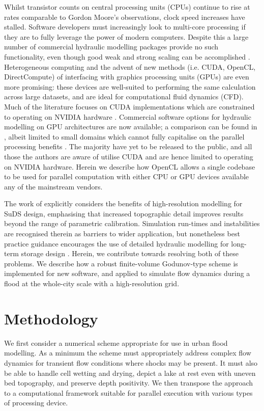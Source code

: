 Whilst transistor counts on central processing units (CPUs) continue to rise at rates comparable to Gordon Moore's observations, clock speed increases have stalled. Software developers must increasingly look to multi-core processing if they are to fully leverage the power of modern computers. Despite this a large number of commercial hydraulic modelling packages provide no such functionality, even though good weak and strong scaling can be accomplished \citep{Sanders2010,Kalyanapu2011,Saetra2012}. Heterogeneous computing and the advent of new methods (i.e. CUDA, OpenCL, DirectCompute) of interfacing with graphics processing units (GPUs) are even more promising: these devices are well-suited to performing the same calculation across large datasets, and are ideal for computational fluid dynamics (CFD). Much of the literature focuses on CUDA implementations which are constrained to operating on NVIDIA hardware \citep[e.g.][]{Kuo2011,Saetra2012}. Commercial software options for hydraulic modelling on GPU architectures are now available; a comparison can be found in \citet{Pender2013}, albeit limited to small domains which cannot fully capitalise on the parallel processing benefits \citep{Saetra2012}. The majority have yet to be released to the public, and all those the authors are aware of utilise CUDA and are hence limited to operating on NVIDIA hardware. Herein we describe how OpenCL allows a single codebase to be used for parallel computation with either CPU or GPU devices available any of the mainstream vendors. 

The work of \citet{Ozdemir2013} explicitly considers the benefits of high-resolution modelling for SuDS design, emphasising that increased topographic detail improves results beyond the range of parametric calibration. Simulation run-times and instabilities are recognised therein as barriers to wider application, but nonetheless best practice guidance encourages the use of detailed hydraulic modelling for long-term storage design \citep{Woods-Ballard2007}. Herein, we contribute towards resolving both of these problems. We describe how a robust finite-volume Godunov-type scheme is implemented for new software, and applied to simulate flow dynamics during a flood at the whole-city scale with a high-resolution grid. 

\section{Methodology}

We first consider a numerical scheme appropriate for use in urban flood modelling. As a minimum the scheme must appropriately address complex flow dynamics for transient flow conditions where shocks may be present. It must also be able to handle cell wetting and drying, depict a lake at rest even with uneven bed topography, and preserve depth positivity. We then transpose the approach to a computational framework suitable for parallel execution with various types of processing device. 

